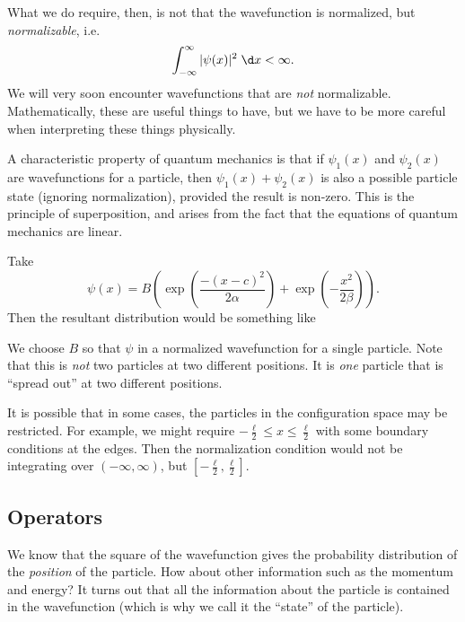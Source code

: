 \documentclass[a4paper]{article}
\begin{document}
What we do require, then, is not that the wavefunction is normalized, but \emph{normalizable}, i.e.
\[
  \int_{-\infty}^\infty |\psi(x)|^2 \;\d x < \infty.
\]
We will very soon encounter wavefunctions that are \emph{not} normalizable. Mathematically, these are useful things to have, but we have to be more careful when interpreting these things physically.

A characteristic property of quantum mechanics is that if $\psi_1(x)$ and $\psi_2(x)$ are wavefunctions for a particle, then $\psi_1(x) + \psi_2 (x)$ is also a possible particle state (ignoring normalization), provided the result is non-zero. This is the principle of superposition, and arises from the fact that the equations of quantum mechanics are linear.

\begin{eg}
  Take
  \[
    \psi(x) = B\left(\exp\left(\frac{-(x - c)^2}{2\alpha}\right) + \exp\left(-\frac{x^2}{2\beta}\right)\right).
  \]
  Then the resultant distribution would be something like
  \begin{center}
  \end{center}
  We choose $B$ so that $\psi$ in a normalized wavefunction for a single particle. Note that this is \emph{not} two particles at two different positions. It is \emph{one} particle that is ``spread out'' at two different positions.
\end{eg}
It is possible that in some cases, the particles in the configuration space may be restricted. For example, we might require $ -\frac{\ell}{2} \leq x \leq \frac{\ell}{2}$ with some boundary conditions at the edges. Then the normalization condition would not be integrating over $(-\infty, \infty)$, but $[-\frac{\ell}{2}, \frac{\ell}{2}]$.

\subsection{Operators}
We know that the square of the wavefunction gives the probability distribution of the \emph{position} of the particle. How about other information such as the momentum and energy? It turns out that all the information about the particle is contained in the wavefunction (which is why we call it the ``state'' of the particle).
\end{document}
